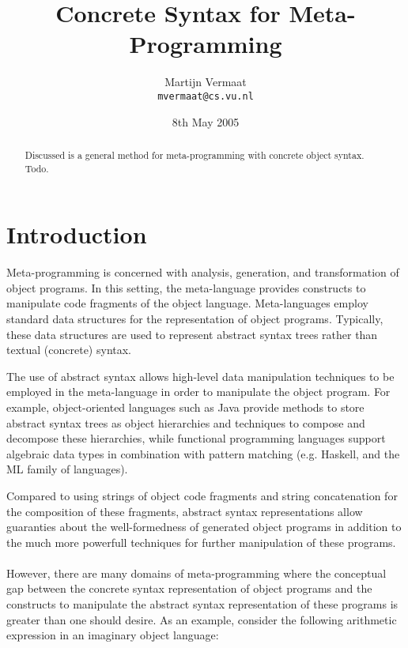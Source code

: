 \documentclass[a4paper,11pt]{article}
\title{Concrete Syntax for Meta-Programming}
\author{Martijn Vermaat\\
\texttt{mvermaat@cs.vu.nl}}
\date{8th May 2005}
\begin{document}
\maketitle


\lstset{
  numbers=none,
  basicstyle=\footnotesize\ttfamily,
  frame=tb,
  language=Pascal,
  captionpos=b,
  xleftmargin=1em,
  xrightmargin=1em,
  aboveskip=1em,
  belowskip=1em
}


\begin{abstract}
Discussed is a general method for meta-programming with concrete object
syntax. Todo.
\end{abstract}


\section{Introduction}

Meta-programming is concerned with analysis, generation, and transformation
of object programs. In this setting, the meta-language provides constructs
to manipulate code fragments of the object language. Meta-languages employ
standard data structures for the representation of object programs. Typically,
these data structures are used to represent abstract syntax trees rather
than textual (concrete) syntax.

The use of abstract syntax allows high-level data manipulation techniques
to be employed in the meta-language in order to manipulate the object program.
For example, object-oriented languages such as Java provide methods to store
abstract syntax trees as object hierarchies and techniques to compose and
decompose these hierarchies, while functional programming languages support
algebraic data types in combination with pattern matching (e.g. Haskell, and
the ML family of languages).

Compared to using strings of object code fragments and string concatenation
for the composition of these fragments, abstract syntax representations allow
guaranties about the well-formedness of generated object programs in addition
to the much more powerfull techniques for further manipulation of these
programs.

\paragraph{}

However, there are many domains of meta-programming where the conceptual gap
between the concrete syntax representation of object programs and the constructs
to manipulate the abstract syntax representation of these programs is greater
than one should desire. As an example, consider the following arithmetic
expression in an imaginary object language:
\end{document}
